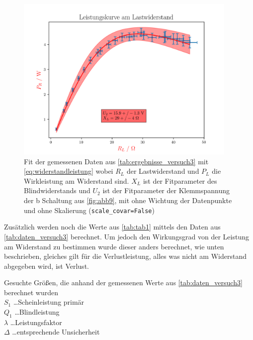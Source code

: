 \documentclass[11pt,ngerman]{scrartcl}
\begin{document}
\begin{figure}[H]
	\begin{center}
		\includegraphics[width=0.95\textwidth]{./bigpics/withoutweigtsandscalecovarfalse.png}
	\end{center}
	\caption{Fit der gemessenen Daten aus \autoref{tab:ergebnisse_versuch3} mit
		\autoref{eq:widerstandleistung} wobei $R_L$ der Lastwiderstand und $P_L$ die
		Wirkleistung am Widerstand sind. $X_L$ ist der Fitparameter des
		Blindwiderstands und $U_2$ ist der Fitparameter der Klemmspannung der b Schaltung aus
		\autoref{fig:abb9}, mit ohne Wichtung der Datenpunkte und ohne Skalierung (\texttt{scale\_covar=False})}
	\label{fig:fit_ohne_wichtung_ohne_skalierung}
\end{figure}


\vspace{2mm}

Zusätzlich werden noch die Werte aus \autoref{tab:tab1} mittels den Daten aus
\autoref{tab:daten_versuch3} berechnet. Um jedoch den Wirkungsgrad von der Leistung am Widerstand zu bestimmen wurde
dieser anders berechnet, wie unten beschrieben, gleiches gilt für die
Verlustleistung, alles was nicht am Widerstand abgegeben wird, ist Verlust.

\begin{table}[H]
	\caption{Gesuchte Größen, die anhand der gemessenen Werte aus
		\autoref{tab:daten_versuch3} berechnet wurden \\
		$S_1$ \dots Scheinleistung primär \\
		$Q_1$ \dots  Blindleistung \\
		$\lambda$ \dots Leistungsfaktor \\
		$\Delta$ \dots entsprechende Unsicherheit
	}
	\label{tab:ergebnisse_versuch3_extra}
	\begin{center}
		
	\end{center}
\end{table}
\end{document}
